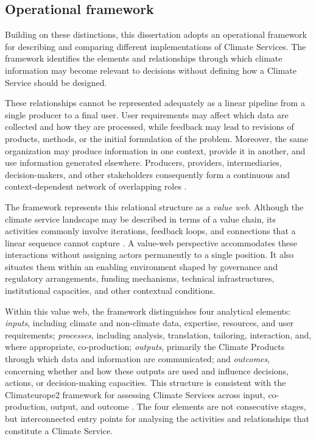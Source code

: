 \subsection{Operational framework}

Building on these distinctions, this dissertation adopts an operational framework for describing and comparing different implementations of Climate Services. The framework identifies the elements and relationships through which climate information may become relevant to decisions without defining how a Climate Service should be designed.

These relationships cannot be represented adequately as a linear pipeline from a single producer to a final user. User requirements may affect which data are collected and how they are processed, while feedback may lead to revisions of products, methods, or the initial formulation of the problem. Moreover, the same organization may produce information in one context, provide it in another, and use information generated elsewhere. Producers, providers, intermediaries, decision-makers, and other stakeholders consequently form a continuous and context-dependent network of overlapping roles \citep{weichselgartner_evolving_2019}.

The framework represents this relational structure as a \textit{value web}. Although the climate service landscape may be described in terms of a value chain, its activities commonly involve iterations, feedback loops, and connections that a linear sequence cannot capture \citep{hewitt_climate_2021}. A value-web perspective accommodates these interactions without assigning actors permanently to a single position. It also situates them within an enabling environment shaped by governance and regulatory arrangements, funding mechanisms, technical infrastructures, institutional capacities, and other contextual conditions.

Within this value web, the framework distinguishes four analytical elements: \textit{inputs}, including climate and non-climate data, expertise, resources, and user requirements; \textit{processes}, including analysis, translation, tailoring, interaction, and, where appropriate, co-production; \textit{outputs}, primarily the Climate Products through which data and information are communicated; and \textit{outcomes}, concerning whether and how these outputs are used and influence decisions, actions, or decision-making capacities. This structure is consistent with the Climateurope2 framework for assessing Climate Services across input, co-production, output, and outcome \citep{villwock_literature_2023}. The four elements are not consecutive stages, but interconnected entry points for analysing the activities and relationships that constitute a Climate Service.